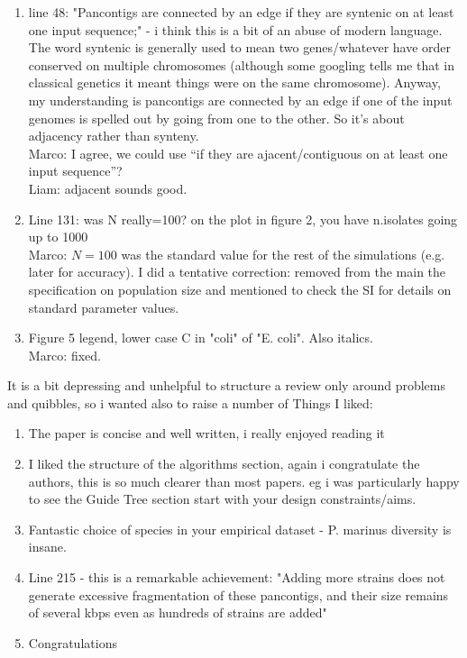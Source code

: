 \documentclass[aps,rmp,onecolumn]{revtex4-1}
\newcommand{\Marco}[1]{{\color{gray}Marco: #1}}
\newcommand{\Liam}[1]{{\color{teal}Liam: #1}}
\begin{document}
\begin{enumerate}
      \item line 48: "Pancontigs are connected by an edge if they are syntenic on at least one input sequence;" - i think this is a bit of an abuse of modern language. The word syntenic is generally used to mean two genes/whatever have order conserved on multiple chromosomes (although some googling tells me that in classical genetics it meant things were on the same chromosome). Anyway, my understanding is pancontigs are connected by an edge if one of the input genomes is spelled out by going from one to the other. So it's about adjacency rather than synteny.\\
            \Marco{I agree, we could use ``if they are ajacent/contiguous on at least one input sequence''?}\\
            \Liam{adjacent sounds good.}

      \item Line 131: was N really=100? on the plot in figure 2, you have n.isolates going up to 1000\\
            \Marco{$N=100$ was the standard value for the rest of the simulations (e.g. later for accuracy). I did a tentative correction: removed from the main the specification on population size and mentioned to check the SI for details on standard parameter values.}

      \item Figure 5 legend, lower case C in "coli" of "E. coli". Also italics.\\
            \Marco{fixed.}
\end{enumerate}


It is a bit depressing and unhelpful to structure a review only around problems and quibbles, so i wanted also to raise a number of
Things I liked:

\begin{enumerate}
      \item The paper is concise and well written, i really enjoyed reading it
      \item I liked the structure of the algorithms section, again i congratulate the authors, this is so much clearer than most papers. eg i was particularly happy to see the Guide Tree section start with your design constraints/aims.
      \item Fantastic choice of species in your empirical dataset - P. marinus diversity is insane.
      \item Line 215 - this is a remarkable achievement: "Adding more strains does not generate excessive fragmentation of these pancontigs, and their size remains of several kbps even as hundreds of strains are added"
      \item Congratulations
\end{enumerate}
\end{document}
